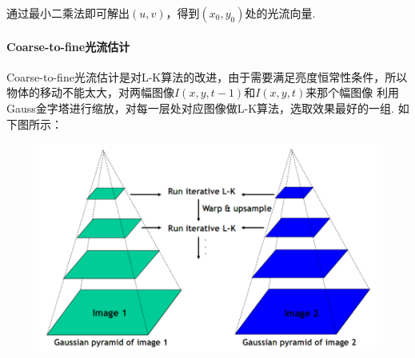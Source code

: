 \documentclass[12pt, a4paper, oneside]{ctexart}
\numberwithin{equation}{section}  %
\theoremstyle{definition}
\begin{document}
通过最小二乘法即可解出$(u,v)$，得到$(x_0,y_0)$处的光流向量.
\paragraph{Coarse-to-fine光流估计}
Coarse-to-fine光流估计是对L-K算法的改进，由于需要满足亮度恒常性条件，所以物体的移动不能太大，对两幅图像$I(x,y,t-1)$和$I(x,y,t)$来那个幅图像
利用Gauss金字塔进行缩放，对每一层处对应图像做L-K算法，选取效果最好的一组. 如下图所示：
\begin{figure}[htbp]
    \centering
    \includegraphics[scale=0.7]{coarse_to_fine光流估计.png}
\end{figure}
\end{document}
